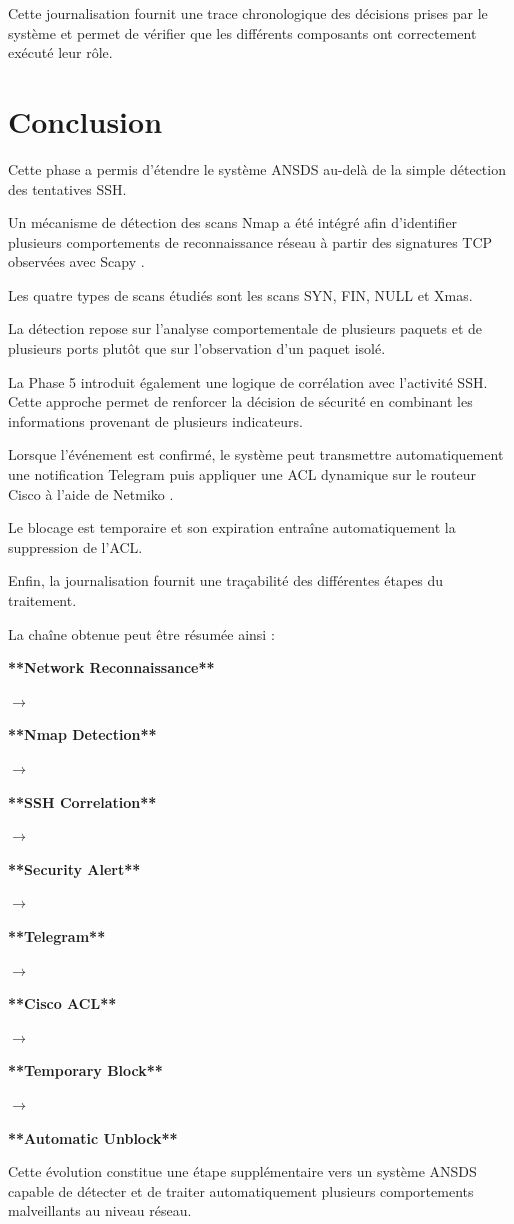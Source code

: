 Cette journalisation fournit une trace chronologique des décisions prises par le système et permet de vérifier que les différents composants ont correctement exécuté leur rôle.

\section{Conclusion}

Cette phase a permis d'étendre le système ANSDS au-delà de la simple détection des tentatives SSH.

Un mécanisme de détection des scans Nmap a été intégré afin d'identifier plusieurs comportements de reconnaissance réseau à partir des signatures TCP observées avec Scapy \cite{scapy_docs}.

Les quatre types de scans étudiés sont les scans SYN, FIN, NULL et Xmas.

La détection repose sur l'analyse comportementale de plusieurs paquets et de plusieurs ports plutôt que sur l'observation d'un paquet isolé.

La Phase 5 introduit également une logique de corrélation avec l'activité SSH. Cette approche permet de renforcer la décision de sécurité en combinant les informations provenant de plusieurs indicateurs.

Lorsque l'événement est confirmé, le système peut transmettre automatiquement une notification Telegram puis appliquer une ACL dynamique sur le routeur Cisco à l'aide de Netmiko \cite{netmiko_docs,cisco_ios}.

Le blocage est temporaire et son expiration entraîne automatiquement la suppression de l'ACL.

Enfin, la journalisation fournit une traçabilité des différentes étapes du traitement.

La chaîne obtenue peut être résumée ainsi :

\begin{center}

\textbf{**Network Reconnaissance**}

$\rightarrow$

\textbf{**Nmap Detection**}

$\rightarrow$

\textbf{**SSH Correlation**}

$\rightarrow$

\textbf{**Security Alert**}

$\rightarrow$

\textbf{**Telegram**}

$\rightarrow$

\textbf{**Cisco ACL**}

$\rightarrow$

\textbf{**Temporary Block**}

$\rightarrow$

\textbf{**Automatic Unblock**}

\end{center}

Cette évolution constitue une étape supplémentaire vers un système ANSDS capable de détecter et de traiter automatiquement plusieurs comportements malveillants au niveau réseau.